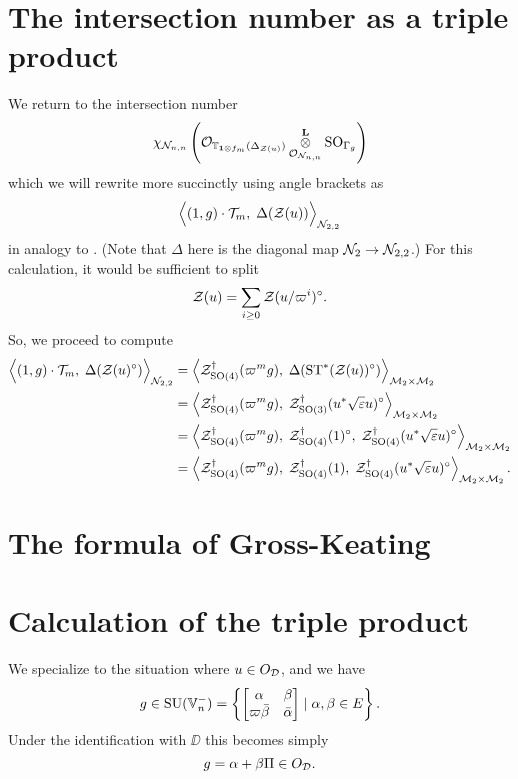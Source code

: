 \section{The intersection number as a triple product}
We return to the intersection number
\[ \chi_{\mathcal N_{n,n}} \left(
      \mathcal{O}_{\mathbb T_{\mathbf{1} \otimes f_m}(\Delta_{\mathcal Z(u)})}
      \mathop{\otimes}^{\mathbf{L}}_{\mathcal{O}_{\mathcal N_{n,n}}} \operatorname{SO}_{\Gamma_g} \right) \]
which we will rewrite more succinctly using angle brackets as
\[ \Big\langle (1,g) \cdot \mathcal{T}_m, \; \Delta(\mathcal Z(u)) \Big\rangle_{\mathcal N_{2,2}} \]
in analogy to \cite[\S6.1]{ref:AFLspherical}.
(Note that $\Delta$ here is the diagonal map $\mathcal N_2 \to \mathcal N_{2,2}$.)
For this calculation, it would be sufficient to split
\[ \mathcal Z(u) = \sum_{i \ge 0} \mathcal Z(u/\varpi^i)^\circ. \]
So, we proceed to compute
\begin{align*}
  \Big\langle (1,g) \cdot \mathcal{T}_m, \; \Delta(\mathcal Z(u)^\circ) \Big\rangle_{\mathcal N_{2,2}}
  &= \left< \mathcal Z^{\dagger}_{\operatorname{SO}(4)}(\varpi^m g), \; \Delta(\operatorname{ST}^\ast(\mathcal Z(u))^\circ) \right>_{\mathcal M_2 \times \mathcal M_2} \\
  &= \left< \mathcal Z^{\dagger}_{\operatorname{SO}(4)}(\varpi^m g), \; \mathcal Z^{\dagger}_{\operatorname{SO}(3)}(u^\ast \sqrt{\varepsilon} u)^\circ \right>_{\mathcal M_2 \times \mathcal M_2} \\
  &= \left< \mathcal Z^{\dagger}_{\operatorname{SO}(4)}(\varpi^m g), \; \mathcal Z^{\dagger}_{\operatorname{SO}(4)}(1)^\circ, \; \mathcal Z^{\dagger}_{\operatorname{SO}(4)}(u^\ast \sqrt{\varepsilon} u)^\circ \right>_{\mathcal M_2 \times \mathcal M_2} \\
  &= \left< \mathcal Z^{\dagger}_{\operatorname{SO}(4)}(\varpi^m g), \; \mathcal Z^{\dagger}_{\operatorname{SO}(4)}(1), \; \mathcal Z^{\dagger}_{\operatorname{SO}(4)}(u^\ast \sqrt{\varepsilon} u)^\circ \right>_{\mathcal M_2 \times \mathcal M_2}.
\end{align*}

\section{The formula of Gross-Keating}
\begin{theorem}
\end{theorem}

\section{Calculation of the triple product}
We specialize to the situation where $u \in O_\mathcal D$,
and we have
\[ g \in \operatorname{SU}(\mathbb V_n^-) = \left\{
    \begin{bmatrix} \alpha & \beta \\ \varpi\bar\beta & \bar\alpha \end{bmatrix}
    \mid \alpha, \beta \in E \right\}. \]
Under the identification with $\DD$ this becomes simply
\[ g = \alpha + \beta \Pi \in O_\mathcal D. \]
